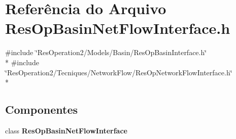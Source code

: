 \section{Referência do Arquivo Res\+Op\+Basin\+Net\+Flow\+Interface.\+h}
\label{_res_op_basin_net_flow_interface_8h}
{\ttfamily \#include \char`\"{}Res\+Operation2/\+Models/\+Basin/\+Res\+Op\+Basin\+Interface.\+h\char`\"{}}\\*
{\ttfamily \#include \char`\"{}Res\+Operation2/\+Tecniques/\+Network\+Flow/\+Res\+Op\+Network\+Flow\+Interface.\+h\char`\"{}}\\*
\subsection*{Componentes}
\begin{DoxyCompactItemize}
\item 
class {\bf Res\+Op\+Basin\+Net\+Flow\+Interface}
\end{DoxyCompactItemize}
